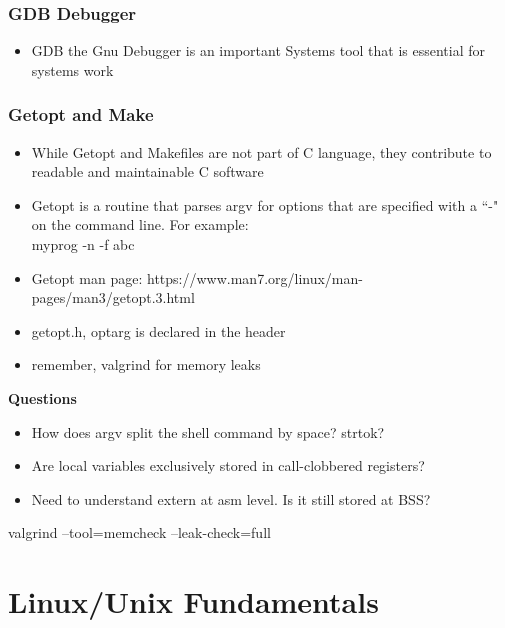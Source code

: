 \subsubsection{GDB Debugger}
\begin{itemize}
    \item GDB the Gnu Debugger is an important Systems tool that is essential for systems work
\end{itemize}
\subsubsection{Getopt and Make}
\begin{itemize}
    \item While Getopt and Makefiles are not part of C language, they contribute to readable and maintainable C software
    \item Getopt is a routine that parses argv for options that are specified with a ``-" on the command line. For example:\\myprog -n -f abc
    \item Getopt man page: https://www.man7.org/linux/man-pages/man3/getopt.3.html
    \item getopt.h, optarg is declared in the header
    \item remember, valgrind for memory leaks
\end{itemize}

\textbf{Questions}
\begin{itemize}
    \item How does argv split the shell command by space? strtok?
    \item Are local variables exclusively stored in call-clobbered registers?
    \item Need to understand extern at asm level. Is it still stored at BSS?
\end{itemize}
valgrind --tool=memcheck --leak-check=full

\section{Linux/Unix Fundamentals}
